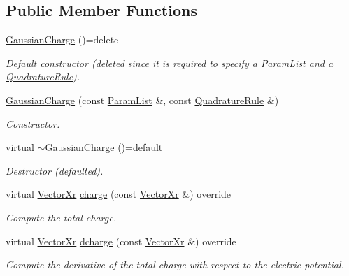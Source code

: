 \subsection*{Public Member Functions}
\begin{DoxyCompactItemize}
\item 
\hypertarget{classGaussianCharge_a860db9bf8bccf98756f1f6bd60de5463}{\hyperlink{classGaussianCharge_a860db9bf8bccf98756f1f6bd60de5463}{Gaussian\-Charge} ()=delete}\label{classGaussianCharge_a860db9bf8bccf98756f1f6bd60de5463}

\begin{DoxyCompactList}\small\item\em Default constructor (deleted since it is required to specify a \hyperlink{classParamList}{Param\-List} and a \hyperlink{classQuadratureRule}{Quadrature\-Rule}). \end{DoxyCompactList}\item 
\hyperlink{classGaussianCharge_a3e5ff9c43a3deb7861ea10435de4bb55}{Gaussian\-Charge} (const \hyperlink{classParamList}{Param\-List} \&, const \hyperlink{classQuadratureRule}{Quadrature\-Rule} \&)
\begin{DoxyCompactList}\small\item\em Constructor. \end{DoxyCompactList}\item 
\hypertarget{classGaussianCharge_ab64872dfef0abc7d116d65373496ac33}{virtual \hyperlink{classGaussianCharge_ab64872dfef0abc7d116d65373496ac33}{$\sim$\-Gaussian\-Charge} ()=default}\label{classGaussianCharge_ab64872dfef0abc7d116d65373496ac33}

\begin{DoxyCompactList}\small\item\em Destructor (defaulted). \end{DoxyCompactList}\item 
virtual \hyperlink{typedefs_8h_aae6cee78ed9cd8f234ed8cb48682548a}{Vector\-Xr} \hyperlink{classGaussianCharge_a97ff25e546dee1ee5fec866b290ec999}{charge} (const \hyperlink{typedefs_8h_aae6cee78ed9cd8f234ed8cb48682548a}{Vector\-Xr} \&) override
\begin{DoxyCompactList}\small\item\em Compute the total charge. \end{DoxyCompactList}\item 
virtual \hyperlink{typedefs_8h_aae6cee78ed9cd8f234ed8cb48682548a}{Vector\-Xr} \hyperlink{classGaussianCharge_a06f7a60ee2bce4590e2a12286aa0e9eb}{dcharge} (const \hyperlink{typedefs_8h_aae6cee78ed9cd8f234ed8cb48682548a}{Vector\-Xr} \&) override
\begin{DoxyCompactList}\small\item\em Compute the derivative of the total charge with respect to the electric potential. \end{DoxyCompactList}\end{DoxyCompactItemize}
